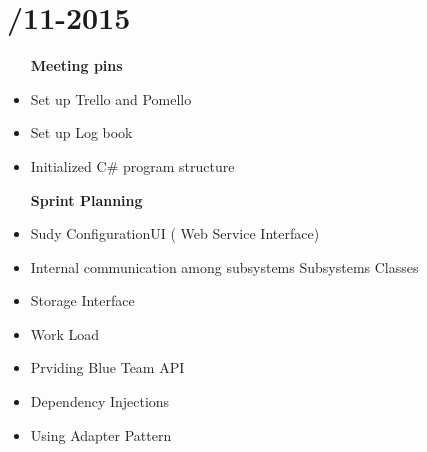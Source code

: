 \section{/11-2015}
\attend{\at}{\at}{\at}{\at}


\begin{itemize}
	\item [\textbf{Meeting pins}]
	\item Set up Trello and Pomello
	\item Set up Log book
	\item Initialized C\# program structure
\end{itemize}

\begin{itemize}
	\item [\textbf{Sprint Planning}]
	\item Sudy ConfigurationUI ( Web Service Interface)
	\item Internal communication among subsystems
	\itme Subsystems Classes
	\item Storage Interface
	\item Work Load
	\item Prviding Blue Team API
	\item Dependency Injections
	\item Using Adapter Pattern
\end{itemize}